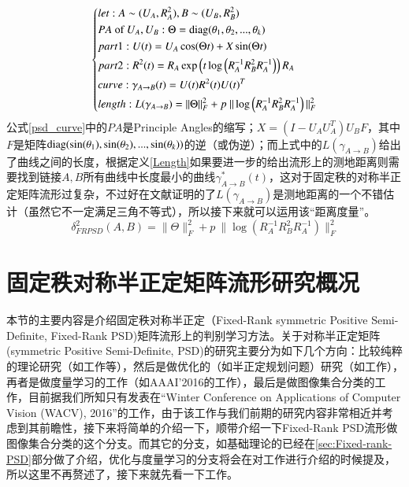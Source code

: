 \begin{equation}
\label{psd_curve}
\left\{
\begin{aligned}
&let:A\sim(U_A,R_{A}^{2}),B\sim(U_B,R_{B}^{2})\\
&PA\text{ of }U_A,U_B:\Theta={\rm diag}(\theta_1,\theta_2,...,\theta_k)\\
&part1:U(t)=U_A\cos(\Theta t)+X\sin(\Theta t)\\
&part2:R^2(t)=R_{A}\exp\left(t\log\left(R_{A}^{-1}R_{B}^{2}R_{A}^{-1}\right)\right)R_{A}\\
&curve:\gamma_{A \rightarrow B}(t)=U(t)R^{2}(t)U(t)^{T}\\
&length:L(\gamma_{A \rightarrow B})=\|\Theta\|_{F}^{2}+p~\|\log\left(R_{A}^{-1}R_{B}^{2}R_{A}^{-1}\right)\|_{F}^{2}
\end{aligned}
\right.
\end{equation}
公式\ref{psd_curve}中的$PA$是Principle Angles的缩写；$X=(I-U_AU_{A}^{T})U_BF$，其中$F$是矩阵${\rm diag}(\sin(\theta_1),\sin(\theta_2),...,\sin(\theta_k))$的逆（或伪逆）；而上式中的$L(\gamma_{A \rightarrow B})$给出了曲线之间的长度，根据定义\ref{Length}如果要进一步的给出流形上的测地距离则需要找到链接$A,B$所有曲线中长度最小的曲线$\gamma_{A \rightarrow B}^{*}(t)$，这对于固定秩的对称半正定矩阵流形过复杂，不过好在文献\cite{PSD_Riemannian}证明的了$L(\gamma_{A \rightarrow B})$是测地距离的一个不错估计（虽然它不一定满足三角不等式），所以接下来就可以运用该“距离度量”。
\begin{equation}
\label{polar_metric}
\delta^{2}_{FRPSD}(A,B)=\|\Theta\|_{F}^{2}+p~\|\log\left(R_{A}^{-1}R_{B}^{2}R_{A}^{-1}\right)\|_{F}^{2}
\end{equation}
\section{固定秩对称半正定矩阵流形研究概况}
\label{sec:Fixed-Rank-PSD-Current}
本节的主要内容是介绍固定秩对称半正定（Fixed-Rank symmetric Positive Semi-Definite, Fixed-Rank PSD)矩阵流形上的判别学习方法。关于对称半正定矩阵(symmetric Positive Semi-Definite, PSD)的研究主要分为如下几个方向：比较纯粹的理论研究（如工作\cite{PSD_Riemannian,PSD_Regression}等），然后是做优化的（如半正定规划问题）研究（如工作\cite{PSD_Opt1}），再者是做度量学习的工作（如AAAI'2016的工作\cite{PSD_AAAI}），最后是做图像集合分类的工作，目前据我们所知只有发表在“Winter Conference on Applications of Computer Vision (WACV), 2016”的工作\cite{PSD_WACV}，由于该工作与我们前期的研究内容非常相近并考虑到其前瞻性，接下来将简单的介绍一下，顺带介绍一下Fixed-Rank PSD流形做图像集合分类的这个分支。而其它的分支，如基础理论的已经在\ref{sec:Fixed-rank-PSD}部分做了介绍，优化与度量学习的分支将会在对工作\cite{PSD_AAAI}进行介绍的时候提及，所以这里不再赘述了，接下来就先看一下工作\cite{PSD_WACV}。

